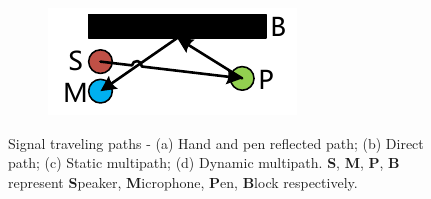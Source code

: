 \begin{figure}[!htp]
  \begin{subfigure}[b]{0.49\textwidth}
    \includegraphics[width=\textwidth]{figure/signal-path-dynamic-multipath}
    \caption{}
    \label{fig:signal-path-dynamic-multipath}
  \end{subfigure}
  {Signal traveling paths - (a) Hand and pen reflected path; (b) Direct path; (c) Static multipath; (d) Dynamic multipath. \textbf{S}, \textbf{M}, \textbf{P}, \textbf{B} represent \textbf{S}peaker, \textbf{M}icrophone, \textbf{P}en, \textbf{B}lock respectively.}
  \label{fig:signal-travel-paths}
\end{figure}



